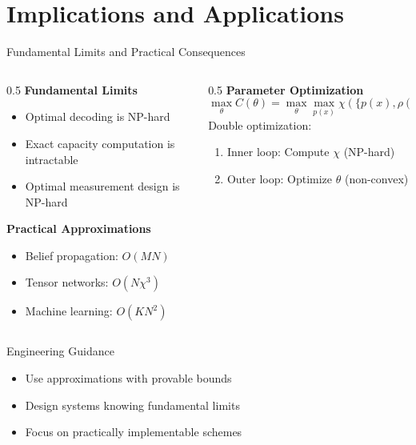\documentclass[10pt]{beamer}
\begin{document}
\section{Implications and Applications}

\begin{frame}{Fundamental Limits and Practical Consequences}
\begin{columns}
\begin{column}{0.5\textwidth}
\textbf{Fundamental Limits}
\begin{itemize}
\item Optimal decoding is NP-hard
\item Exact capacity computation is intractable
\item Optimal measurement design is NP-hard
\end{itemize}

\textbf{Practical Approximations}
\begin{itemize}
\item Belief propagation: $O(MN)$
\item Tensor networks: $O(N\chi^3)$
\item Machine learning: $O(KN^2)$
\end{itemize}
\end{column}

\begin{column}{0.5\textwidth}
\textbf{Parameter Optimization}
\begin{equation*}
\max_{\theta} C(\theta) = \max_{\theta} \max_{p(x)} \chi(\{p(x), \rho(x|\theta)\})
\end{equation*}
Double optimization:
\begin{enumerate}
\item Inner loop: Compute $\chi$ (NP-hard)
\item Outer loop: Optimize $\theta$ (non-convex)
\end{enumerate}
\end{column}
\end{columns}

\begin{block}{Engineering Guidance}
\begin{itemize}
\item Use approximations with provable bounds
\item Design systems knowing fundamental limits
\item Focus on practically implementable schemes
\end{itemize}
\end{block}
\end{frame}
\end{document}
